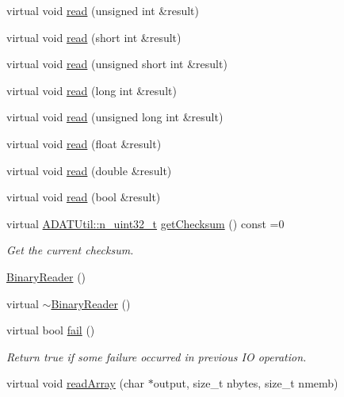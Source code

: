 \begin{DoxyCompactItemize}
virtual void \mbox{\hyperlink{classADATIO_1_1BinaryReader_a79b60cbc85fa4d509ed0b9f09ad8eec0}{read}} (unsigned int \&result)
\item 
virtual void \mbox{\hyperlink{classADATIO_1_1BinaryReader_a801cac241b2dfded7f194e538e2f0e64}{read}} (short int \&result)
\item 
virtual void \mbox{\hyperlink{classADATIO_1_1BinaryReader_a6848f34fe230f8816d2f6e05555c8986}{read}} (unsigned short int \&result)
\item 
virtual void \mbox{\hyperlink{classADATIO_1_1BinaryReader_a54d1773f6ade89cf751ae06b578676e2}{read}} (long int \&result)
\item 
virtual void \mbox{\hyperlink{classADATIO_1_1BinaryReader_a178aa7c188be98be42be14e4c5e93166}{read}} (unsigned long int \&result)
\item 
virtual void \mbox{\hyperlink{classADATIO_1_1BinaryReader_ac45d4457ae358122030b5b9338bab3d2}{read}} (float \&result)
\item 
virtual void \mbox{\hyperlink{classADATIO_1_1BinaryReader_a484af95f04e83aef68a6be054df84876}{read}} (double \&result)
\item 
virtual void \mbox{\hyperlink{classADATIO_1_1BinaryReader_aa4339bc0d5545d2697e498b6da4118a7}{read}} (bool \&result)
\item 
virtual \mbox{\hyperlink{namespaceADATUtil_ad945a8afa4db2d1f89b731964adae97e}{A\+D\+A\+T\+Util\+::n\+\_\+uint32\+\_\+t}} \mbox{\hyperlink{classADATIO_1_1BinaryReader_acd705bb96d557a5437410b55beb40bda}{get\+Checksum}} () const =0
\begin{DoxyCompactList}\small\item\em Get the current checksum. \end{DoxyCompactList}\item 
\mbox{\hyperlink{classADATIO_1_1BinaryReader_a19220cacd1c2fce407b2606d202ff1c5}{Binary\+Reader}} ()
\item 
virtual \mbox{\hyperlink{classADATIO_1_1BinaryReader_a0410bcb7a122066b009e538ed5d47c5c}{$\sim$\+Binary\+Reader}} ()
\item 
virtual bool \mbox{\hyperlink{classADATIO_1_1BinaryReader_a4db0ebc0b7edd371bf0daa98e3bc696b}{fail}} ()
\begin{DoxyCompactList}\small\item\em Return true if some failure occurred in previous IO operation. \end{DoxyCompactList}\item 
virtual void \mbox{\hyperlink{classADATIO_1_1BinaryReader_aba9bb1d3a6af4b6ab28388f6bd003d91}{read\+Array}} (char $\ast$output, size\+\_\+t nbytes, size\+\_\+t nmemb)

\end{DoxyCompactItemize}

